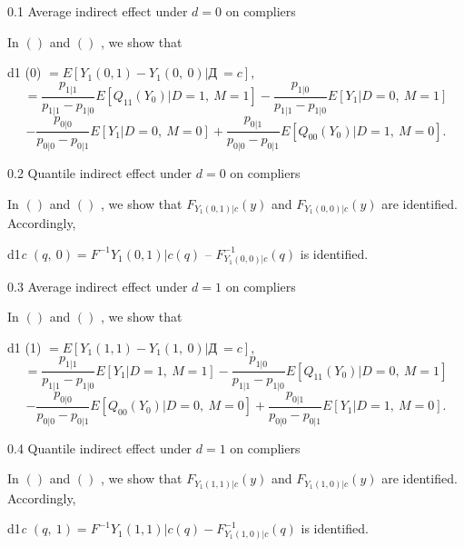 \documentclass[a4paper,12pt]{article}
\begin{document}
0.1 Average indirect effect under $d=0$ on compliers

In $()$ and $()$ , we show that
\begin{center}
d1 (0) $=E[Y_{1}(0,1)-Y_{1}(0,\ 0)|Д\ =c],$
$$
=\frac{p_{1|1}}{p_{1|1}-p_{1|0}}E[Q_{11}(Y_{0})|D=1,\ M=1]-\frac{p_{1|0}}{p_{1|1}-p_{1|0}}E[Y_{1}|D=0,\ M=1]
$$
$$
-\frac{p_{0|0}}{p_{0|0}-p_{0|1}}E[Y_{1}|D=0,\ M=0]+\frac{p_{0|1}}{p_{0|0}-p_{0|1}}E[Q_{00}(Y_{0})|D=1,\ M=0].
$$
\end{center}
0.2 Quantile indirect effect under $d=0$ on compliers

In $()$ and $()$ , we show that $F_{Y_{1}(0,1)|c}(y)$ and $F_{Y_{1}(0,0)|c}(y)$ are identified. Accordingly,

d1{\it c} $(q,\ 0) = F^{-1}Y_{1}(0,1)|c(q)$ -- $F_{Y_{1}(0,0)|c}^{-1}(q)$ is identified.

0.3 Average indirect effect under $d=1$ on compliers

In $()$ and $()$ , we show that
\begin{center}
d1 (1) $=E[Y_{1}(1,1)-Y_{1}(1,\ 0)|Д\ =c],$
$$
=\frac{p_{1|1}}{p_{1|1}-p_{1|0}}E[Y_{1}|D=1,\ M=1]-\frac{p_{1|0}}{p_{1|1}-p_{1|0}}E[Q_{11}(Y_{0})|D=0,\ M=1]
$$
$$
-\frac{p_{0|0}}{p_{0|0}-p_{0|1}}E[Q_{00}(Y_{0})|D=0,\ M=0]+\frac{p_{0|1}}{p_{0|0}-p_{0|1}}E[Y_{1}|D=1,\ M=0].
$$
\end{center}
0.4 Quantile indirect effect under $d=1$ on compliers

In $()$ and $()$ , we show that $F_{Y_{1}(1,1)|c}(y)$ and $F_{Y_{1}(1,0)|c}(y)$ are identified. Accordingly,

d1{\it c} $(q,\ 1)=F^{-1}Y_{1}(1,1)|c(q)-F_{Y_{1}(1,0)|c}^{-1}(q)$ is identified.
\end{document}
